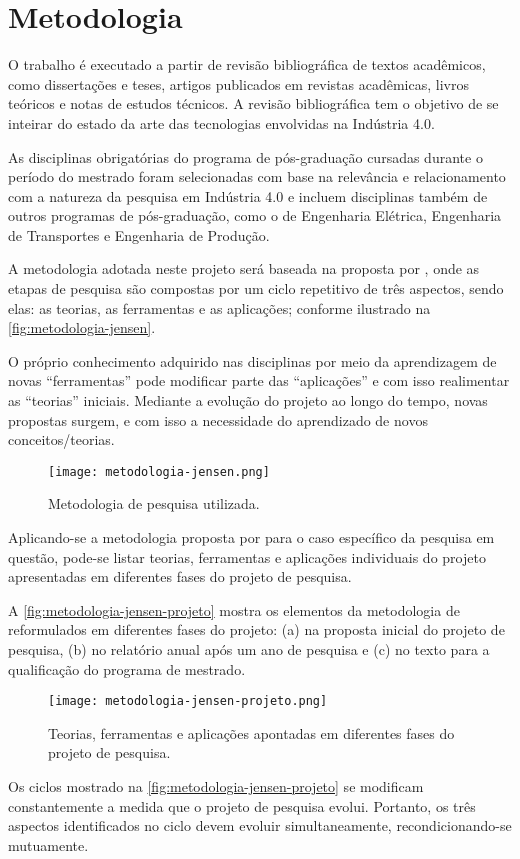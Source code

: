 \chapter{Metodologia}
\label{cha:metodologia}

	O trabalho é executado a partir de revisão bibliográfica de textos acadêmicos, como dissertações e teses, artigos publicados em revistas acadêmicas, livros teóricos e notas de estudos técnicos. A revisão bibliográfica tem o objetivo de se inteirar do estado da arte das tecnologias envolvidas na Indústria 4.0.
	
	As disciplinas obrigatórias do programa de pós-graduação cursadas durante o período do mestrado foram selecionadas com base na relevância e relacionamento com a natureza da pesquisa em Indústria 4.0 e incluem disciplinas também de outros programas de pós-graduação, como o de Engenharia Elétrica, Engenharia de Transportes e Engenharia de Produção.
	
	A metodologia adotada neste projeto será baseada na proposta por , onde as etapas de pesquisa são compostas por um ciclo repetitivo de três aspectos, sendo elas: as teorias, as ferramentas e as aplicações; conforme ilustrado na \autoref{fig:metodologia-jensen}.
	
	O próprio conhecimento adquirido nas disciplinas por meio da aprendizagem de novas “ferramentas” pode modificar parte das “aplicações” e com isso realimentar as “teorias” iniciais. Mediante a evolução do projeto ao longo do tempo, novas propostas surgem, e com isso a necessidade do aprendizado de novos conceitos/teorias.

	\begin{figure}[htb]
		\centering
		\caption{Metodologia de pesquisa utilizada.}
		\label{fig:metodologia-jensen}
		\texttt{[image: metodologia-jensen.png]}
	\end{figure}

	Aplicando-se a metodologia proposta por  para o caso específico da pesquisa em questão, pode-se listar teorias, ferramentas e aplicações individuais do projeto apresentadas em diferentes fases do projeto de pesquisa.
	
	A \autoref{fig:metodologia-jensen-projeto} mostra os elementos da metodologia de  reformulados em diferentes fases do projeto: (a) na proposta inicial do projeto de pesquisa, (b) no relatório anual após um ano de pesquisa e (c) no texto para a qualificação do programa de mestrado.
	
	\begin{figure}[htb]
		\centering
		\caption{Teorias, ferramentas e aplicações apontadas em diferentes fases do projeto de pesquisa.}
		\label{fig:metodologia-jensen-projeto}
		\texttt{[image: metodologia-jensen-projeto.png]}
	\end{figure}
	
	 Os ciclos mostrado na \autoref{fig:metodologia-jensen-projeto} se modificam constantemente a medida que o projeto de pesquisa evolui. Portanto, os três aspectos identificados no ciclo devem evoluir simultaneamente, recondicionando-se mutuamente.

